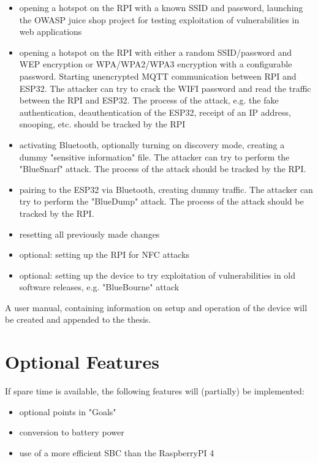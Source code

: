 \documentclass{article}
\begin{document}
\begin{itemize}
	\item opening a hotspot on the RPI with a known SSID and password, launching the OWASP juice shop project for testing exploitation of vulnerabilities in web applications 
	\item opening a hotspot on the RPI with either a random SSID/password and WEP encryption or WPA/WPA2/WPA3 encryption with a configurable password. 
    Starting unencrypted MQTT communication between RPI and ESP32. 
    The attacker can try to crack the WIFI password and read the traffic between the RPI and ESP32. 
    The process of the attack, e.g. the fake authentication, deauthentication of the ESP32, receipt of an IP address, snooping, etc. should be tracked by the RPI 
    \item activating Bluetooth, optionally turning on discovery mode, creating a dummy "sensitive information" file. The attacker can try to perform the "BlueSnarf" attack. 
    The process of the attack should be tracked by the RPI.
	\item pairing to the ESP32 via Bluetooth, creating dummy traffic. The attacker can try to perform the "BlueDump" attack.
    The process of the attack should be tracked by the RPI.
	\item resetting all previously made changes
	\item optional: setting up the RPI for NFC attacks
	\item optional: setting up the device to try exploitation of vulnerabilities in old software releases, e.g. "BlueBourne" attack 
\end{itemize}

A user manual, containing information on setup and operation of the device will be created and appended to the thesis.


\section{Optional Features}
    If spare time is available, the following features will (partially) be implemented:

    \begin{itemize}
        \item optional points in "Goals"
        \item conversion to battery power
        \item use of a more efficient SBC than the RaspberryPI 4
    \end{itemize}
\end{document}
